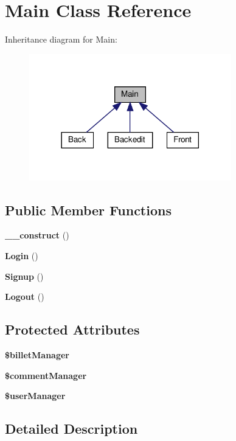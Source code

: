 \section{Main Class Reference}
\label{class_src_1_1_controllers_1_1_main}


Inheritance diagram for Main\+:
\nopagebreak
\begin{figure}[H]
\begin{center}
\leavevmode
\includegraphics[width=249pt]{class_src_1_1_controllers_1_1_main__inherit__graph}
\end{center}
\end{figure}
\subsection*{Public Member Functions}
\begin{DoxyCompactItemize}
\item 
\textbf{ \+\_\+\+\_\+construct} ()
\item 
\textbf{ Login} ()
\item 
\textbf{ Signup} ()
\item 
\textbf{ Logout} ()
\end{DoxyCompactItemize}
\subsection*{Protected Attributes}
\begin{DoxyCompactItemize}
\item 
\textbf{ \$billet\+Manager}
\item 
\textbf{ \$comment\+Manager}
\item 
\textbf{ \$user\+Manager}
\end{DoxyCompactItemize}


\subsection{Detailed Description}


